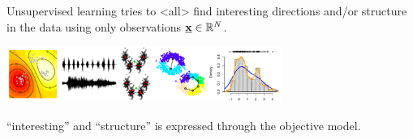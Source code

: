 \begin{frame}{\subsubsecname}

\svspace{-5mm}


\pause


\pause

Unsupervised learning tries to 
\mode<all>
find interesting directions and/or structure in the data using only observations $\underline{\mathbf{x}} \in \mathbb{R}^N$.

\begin{center}
	\includegraphics[width=9cm]{img/mi2}
\end{center}

``interesting'' and  ``structure'' is expressed through the objective model.

\end{frame}

